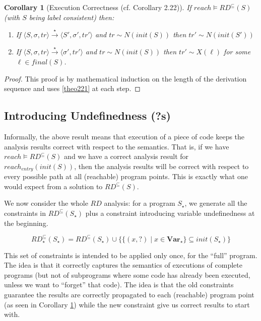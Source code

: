 \documentclass[a4wide,12pt]{article}
\theoremstyle{definition}
\theoremstyle{plain}
\newtheorem{cor}[theo]{Corollary}
\theoremstyle{remark}
\def\const#1{\mathopen{\langle}#1\mathclose{\rangle}} %
\def\pair#1{\const{#1}}
\def\Var {\mathbf{Var}}
\def\starto{\overset{\star}{\to}}
\begin{document}
\begin{cor}[Execution Correctness (cf. Corollary 2.22)]\label{cor222}
If $reach \models RD^\subseteq(S)$ (with $S$ being label consistent) then:


\begin{enumerate}
\item If $\pair{S, \sigma, tr} \starto \pair{S', \sigma', tr'}$ and $ tr \sim
N(init(S))$ then $tr' \sim N(init(S'))$
\item If $\pair{S, \sigma, tr} \starto \pair{\sigma', tr'}$ and $ tr \sim
N(init(S))$ then $tr' \sim X(\ell)$ for some $\ell \in final(S)$.
\end{enumerate}
\end{cor}
\begin{proof}
This proof is by mathematical induction on the length of the derivation sequence and uses
\ref{theo221} at each step.
\end{proof}


\subsection*{Introducing Undefinedness (?s)}

Informally, the above result means that execution of a piece of code keeps the analysis results correct with respect to the semantics.
That is, if we have $reach \models RD^\subseteq(S)$ and we have a correct analysis result for $reach_{entry}(init(S))$, then the analysis results will
be correct with respect to every possible path at all (reachable) program points. 
This is exactly what one would expect from a solution to $RD^\subseteq(S)$. 

We now consider the whole $RD$ analysis:
for a program $S_\star$, we generate all the constraints in $RD^\subseteq(S_\star)$ plus a constraint
introducing variable undefinedness at the beginning. 
 
\[RD^\subseteq_\star(S_\star) = RD^\subseteq(S_\star) \cup \{ \{(x,?) \mid x \in \Var_\star\} \subseteq init(S_\star) \}\]

This set of constraints is intended to be applied only once, for the ``full'' program.
The idea is that it correctly captures the semantics of executions of complete programs
(but not of subprograms where some code has already been executed, unless we want to ``forget''
that code).
The idea is that the old constraints guarantee the results are correctly propagated to each (reachable)
program point (as seen in Corollary \ref{cor222}) while the new constraint give us correct results to start with.
\end{document}
